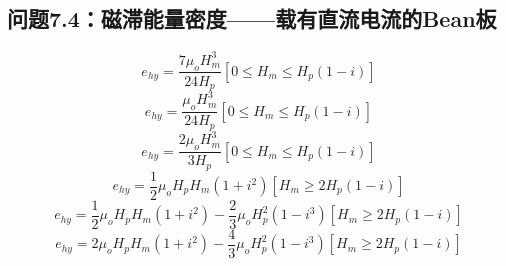 \subsection{问题7.4：磁滞能量密度——载有直流电流的Bean板}
\begin{equation}%
e_{hy}=\frac{7\mu_oH_{m}^{3}}{24H_p}      [0\leq H_m\leq H_p(1-i)]
\end{equation}
\begin{equation}%
e_{hy}=\frac{\mu_oH_{m}^{3}}{24H_p}       [0\leq H_m\leq H_p(1-i)]
\end{equation}
\begin{equation}%
e_{hy}=\frac{2\mu_oH_{m}^{3}}{3H_p}       [0\leq H_m\leq H_p(1-i)]
\end{equation}
\begin{equation}%
e_{hy}=\frac{1}{2}\mu_oH_pH_m(1+i^2)      [H_m\geq2H_p(1-i)]
\end{equation}
\begin{equation}%
e_{hy}=\frac{1}{2}\mu_oH_pH_m(1+i^2)-\frac{2}{3}\mu_oH_{p}^{2}(1-i^3)   [H_m\geq2H_p(1-i)]
\end{equation}
\begin{equation}%
e_{hy}=2\mu_oH_pH_m(1+i^2)-\frac{4}{3}\mu_oH_{p}^{2}(1-i^3)     [H_m\geq2H_p(1-i)]
\end{equation}


